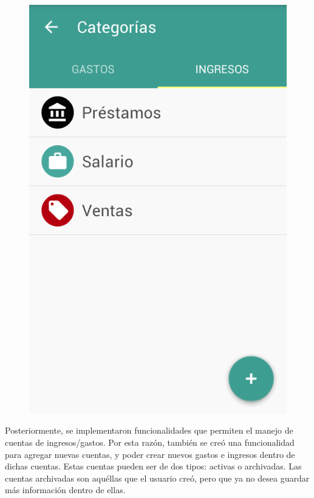\begin{figure}[ht]
\begin{minipage}{.5\textwidth}
\centering
  \includegraphics[scale=0.4,type=png,ext=.png,read=.png]{imagenes/income_categories}
  \captionsetup{justification=centering}
  \label{fig:interfazListarIncomeCategories}
\end{minipage}
\end{figure}

Posteriormente, se implementaron funcionalidades que permiten el manejo de cuentas de ingresos/gastos. Por esta razón, también se creó una funcionalidad para agregar nuevas cuentas, y poder crear nuevos gastos e ingresos dentro de dichas cuentas. Estas cuentas pueden ser de dos tipos: activas o archivadas. Las cuentas archivadas son aquéllas que el usuario creó, pero que ya no desea guardar más información dentro de ellas.

